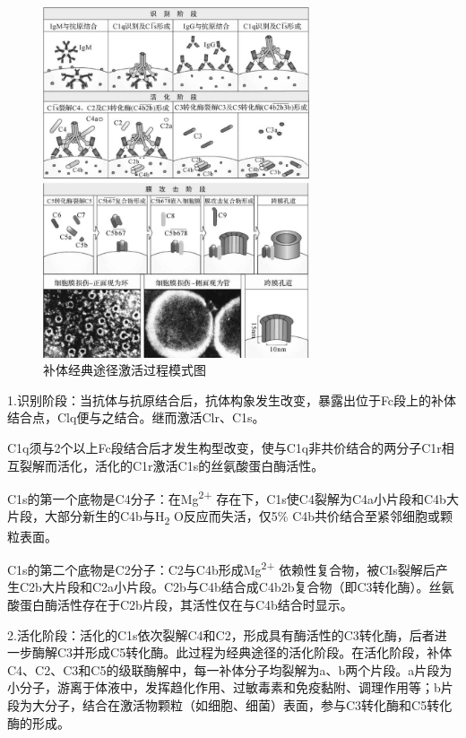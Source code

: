 \begin{figure}[!htbp]
 \centering
 \includegraphics[width=0.7\textwidth]{./images/Image00081.jpg}
 \captionsetup{justification=centering}
 \caption{补体经典途径激活过程模式图}
 \label{fig5-3}
  \end{figure} 

1.识别阶段：当抗体与抗原结合后，抗体构象发生改变，暴露出位于Fc段上的补体结合点，Clq便与之结合。继而激活Clr、C1s。

C1q须与2个以上Fc段结合后才发生构型改变，使与C1q非共价结合的两分子C1r相互裂解而活化，活化的C1r激活C1s的丝氨酸蛋白酶活性。

C1s的第一个底物是C4分子：在Mg\textsuperscript{2+}
存在下，C1s使C4裂解为C4a小片段和C4b大片段，大部分新生的C4b与H\textsubscript{2}
O反应而失活，仅5\% C4b共价结合至紧邻细胞或颗粒表面。

C1s的第二个底物是C2分子：C2与C4b形成Mg\textsuperscript{2+}
依赖性复合物，被CIs裂解后产生C2b大片段和C2a小片段。C2b与C4b结合成C4b2b复合物（即C3转化酶）。丝氨酸蛋白酶活性存在于C2b片段，其活性仅在与C4b结合时显示。

2.活化阶段：活化的C1s依次裂解C4和C2，形成具有酶活性的C3转化酶，后者进一步酶解C3并形成C5转化酶。此过程为经典途径的活化阶段。在活化阶段，补体C4、C2、C3和C5的级联酶解中，每一补体分子均裂解为a、b两个片段。a片段为小分子，游离于体液中，发挥趋化作用、过敏毒素和免疫黏附、调理作用等；b片段为大分子，结合在激活物颗粒（如细胞、细菌）表面，参与C3转化酶和C5转化酶的形成。

